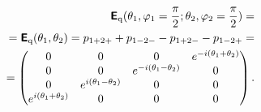 \documentclass[%
  twocolumn,
 showpacs,
 showkeys,
 preprintnumbers,
 amsmath,amssymb,
 aps,
  pra,
  longbibliography,
 floatfix,
 ]{revtex4-1}
\begin{document}
\begin{equation}
\begin{split}
\textsf{\textbf{E}}_{\text{q}} ( \theta_1,\varphi_1=\frac{\pi}{2}; \theta_2,\varphi_2=\frac{\pi}{2} ) =  \\
=\textsf{\textbf{E}}_{\text{q}} ( \theta_1, \theta_2 ) = p_{1+2+}+ p_{1-2-}  -p_{1+2-} -p_{1-2+}
=  \\ =
\begin{pmatrix}
 0 & 0 & 0 & e^{-i (\theta_1 + \theta_2)} \\
 0 & 0 & e^{-i (\theta_1 -\theta_2)} & 0 \\
 0 & e^{i (\theta_1-  \theta_2)} & 0 & 0 \\
 e^{i (\theta_1+  \theta_2)} & 0 & 0 & 0 \\
\end{pmatrix}
.
\end{split}
\label{e-2017-b-whatever-e2}
\end{equation}
\end{document}

